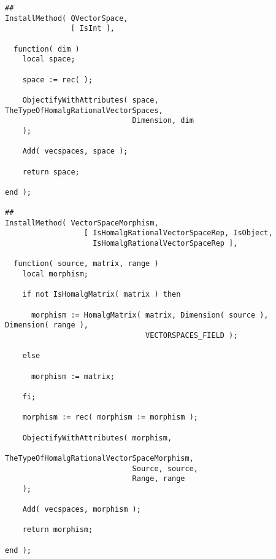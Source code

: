 \begin{small}
\begin{Verbatim}[commandchars=!@\%,frame=single]
##
InstallMethod( QVectorSpace,
               [ IsInt ],
               
  function( dim )
    local space;
    
    space := rec( );
    
    ObjectifyWithAttributes( space, TheTypeOfHomalgRationalVectorSpaces,
                             Dimension, dim 
    );
    
    Add( vecspaces, space );
    
    return space;
    
end );

##
InstallMethod( VectorSpaceMorphism,
                  [ IsHomalgRationalVectorSpaceRep, IsObject,
                    IsHomalgRationalVectorSpaceRep ],
                  
  function( source, matrix, range )
    local morphism;

    if not IsHomalgMatrix( matrix ) then
    
      morphism := HomalgMatrix( matrix, Dimension( source ), Dimension( range ),
                                VECTORSPACES_FIELD );

    else

      morphism := matrix;

    fi;

    morphism := rec( morphism := morphism );
    
    ObjectifyWithAttributes( morphism,
                             TheTypeOfHomalgRationalVectorSpaceMorphism,
                             Source, source,
                             Range, range 
    );

    Add( vecspaces, morphism );
    
    return morphism;
    
end );
\end{Verbatim}
\end{small}
